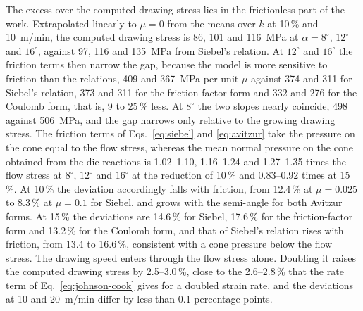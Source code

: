 The excess over the computed drawing stress lies in the frictionless part of the work. Extrapolated linearly to $\mu = 0$ from the means over $k$ at 10\,\% and 10~m/min, the
computed drawing stress is 86, 101 and 116~MPa at $\alpha = 8^\circ$, $12^\circ$ and $16^\circ$,
against 97, 116 and 135~MPa from Siebel's relation. At $12^\circ$ and $16^\circ$ the friction terms
then narrow the gap, because the model is more sensitive to friction than the relations, 409 and
367~MPa per unit $\mu$ against 374 and 311 for Siebel's relation, 373 and 311 for the friction-factor
form and 332 and 276 for the Coulomb form, that is, 9 to 25\,\% less. At $8^\circ$ the two slopes nearly
coincide, 498 against 506~MPa, and the gap narrows only relative to the growing drawing stress.
The friction terms of Eqs.~\eqref{eq:siebel} and \eqref{eq:avitzur} take the pressure on the cone
equal to the flow stress, whereas the mean normal pressure on the cone obtained from the die
reactions is 1.02--1.10, 1.16--1.24 and 1.27--1.35 times the flow stress at $8^\circ$, $12^\circ$
and $16^\circ$ at the reduction of 10\,\% and 0.83--0.92 times at 15\,\%. At 10\,\% the deviation
accordingly falls with friction, from 12.4\,\% at $\mu = 0.025$ to 8.3\,\% at $\mu = 0.1$ for
Siebel, and grows with the semi-angle for both Avitzur forms. At 15\,\% the deviations are
14.6\,\% for Siebel, 17.6\,\% for the friction-factor form and 13.2\,\% for the Coulomb form, and
that of Siebel's relation rises with friction, from 13.4 to 16.6\,\%, consistent with a cone
pressure below the flow stress. The drawing speed enters through the flow stress alone. Doubling
it raises the computed drawing stress by 2.5--3.0\,\%, close to the 2.6--2.8\,\% that the rate
term of Eq.~\eqref{eq:johnson-cook} gives for a doubled strain rate, and the deviations at 10 and
20~m/min differ by less than 0.1 percentage points.

